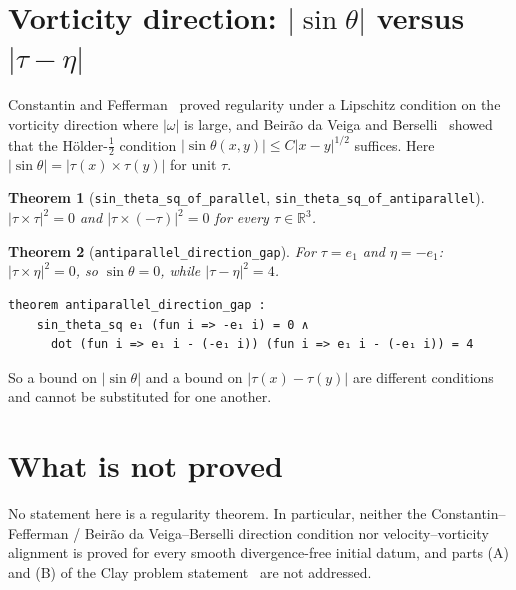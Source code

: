 \documentclass[11pt]{article}
\newtheorem{theorem}{Theorem}
\theoremstyle{definition}
\theoremstyle{remark}
\newcommand{\lean}[1]{\texttt{\upshape #1}}
\newcommand{\R}{\mathbb{R}}
\begin{document}
\section{Vorticity direction: $|\sin\theta|$ versus $|\tau-\eta|$}
Constantin and Fefferman~\cite{CF93} proved regularity under a Lipschitz
condition on the vorticity direction where $|\omega|$ is large, and
Beirão da Veiga and Berselli~\cite{BVB02} showed that the Hölder-$\tfrac12$
condition $|\sin\theta(x,y)|\le C|x-y|^{1/2}$ suffices. Here
$|\sin\theta|=|\tau(x)\times\tau(y)|$ for unit $\tau$.
\begin{theorem}[\lean{sin_theta_sq_of_parallel}, \lean{sin_theta_sq_of_antiparallel}]
$|\tau\times\tau|^2=0$ and $|\tau\times(-\tau)|^2=0$ for every $\tau\in\R^3$.
\end{theorem}
\begin{theorem}[\lean{antiparallel_direction_gap}]
For $\tau=e_1$ and $\eta=-e_1$: $|\tau\times\eta|^2=0$, so $\sin\theta=0$,
while $|\tau-\eta|^2=4$.
\begin{Verbatim}[fontsize=\small]
theorem antiparallel_direction_gap :
    sin_theta_sq e₁ (fun i => -e₁ i) = 0 ∧
      dot (fun i => e₁ i - (-e₁ i)) (fun i => e₁ i - (-e₁ i)) = 4
\end{Verbatim}
\end{theorem}
So a bound on $|\sin\theta|$ and a bound on $|\tau(x)-\tau(y)|$ are different
conditions and cannot be substituted for one another.

\section{What is not proved}
No statement here is a regularity theorem. In particular, neither the
Constantin--Fefferman / Beirão da Veiga--Berselli direction condition nor
velocity--vorticity alignment is proved for every smooth divergence-free
initial datum, and parts (A) and (B) of the Clay problem
statement~\cite{Fef06} are not addressed.
\end{document}

